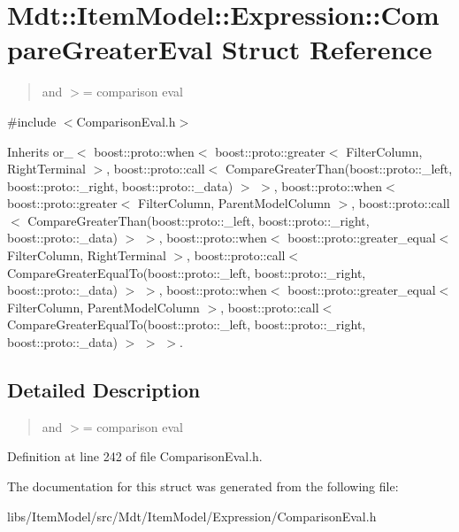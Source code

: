 \hypertarget{struct_mdt_1_1_item_model_1_1_expression_1_1_compare_greater_eval}{}\section{Mdt\+:\+:Item\+Model\+:\+:Expression\+:\+:Compare\+Greater\+Eval Struct Reference}
\label{struct_mdt_1_1_item_model_1_1_expression_1_1_compare_greater_eval}


\begin{quote}
and $>$= comparison eval \end{quote}
 




{\ttfamily \#include $<$Comparison\+Eval.\+h$>$}



Inherits or\+\_\+$<$ boost\+::proto\+::when$<$ boost\+::proto\+::greater$<$ Filter\+Column, Right\+Terminal $>$, boost\+::proto\+::call$<$ Compare\+Greater\+Than(boost\+::proto\+::\+\_\+left, boost\+::proto\+::\+\_\+right, boost\+::proto\+::\+\_\+data) $>$ $>$, boost\+::proto\+::when$<$ boost\+::proto\+::greater$<$ Filter\+Column, Parent\+Model\+Column $>$, boost\+::proto\+::call$<$ Compare\+Greater\+Than(boost\+::proto\+::\+\_\+left, boost\+::proto\+::\+\_\+right, boost\+::proto\+::\+\_\+data) $>$ $>$, boost\+::proto\+::when$<$ boost\+::proto\+::greater\+\_\+equal$<$ Filter\+Column, Right\+Terminal $>$, boost\+::proto\+::call$<$ Compare\+Greater\+Equal\+To(boost\+::proto\+::\+\_\+left, boost\+::proto\+::\+\_\+right, boost\+::proto\+::\+\_\+data) $>$ $>$, boost\+::proto\+::when$<$ boost\+::proto\+::greater\+\_\+equal$<$ Filter\+Column, Parent\+Model\+Column $>$, boost\+::proto\+::call$<$ Compare\+Greater\+Equal\+To(boost\+::proto\+::\+\_\+left, boost\+::proto\+::\+\_\+right, boost\+::proto\+::\+\_\+data) $>$ $>$ $>$.



\subsection{Detailed Description}
\begin{quote}
and $>$= comparison eval \end{quote}


Definition at line 242 of file Comparison\+Eval.\+h.



The documentation for this struct was generated from the following file\+:\begin{DoxyCompactItemize}
\item 
libs/\+Item\+Model/src/\+Mdt/\+Item\+Model/\+Expression/Comparison\+Eval.\+h\end{DoxyCompactItemize}
